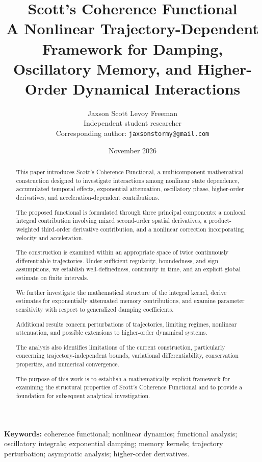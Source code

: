 \documentclass[12pt]{article}
\title{
\textbf{Scott's Coherence Functional}\\[0.5em]
\large A Nonlinear Trajectory-Dependent Framework
for Damping, Oscillatory Memory, and Higher-Order
Dynamical Interactions
}
\author{
Jaxson Scott Levoy Freeman\\
\small Independent student researcher\\
\small Corresponding author:
\texttt{jaxsonstormy@gmail.com}
}
\date{November 2026}
\numberwithin{equation}{section}
\theoremstyle{definition}
\theoremstyle{remark}
\begin{document}
\maketitle


\begin{abstract}

This paper introduces Scott's Coherence Functional,
a multicomponent mathematical construction designed
to investigate interactions among nonlinear state
dependence, accumulated temporal effects,
exponential attenuation, oscillatory phase,
higher-order derivatives, and acceleration-dependent
contributions.

The proposed functional is formulated through three
principal components: a nonlocal integral contribution
involving mixed second-order spatial derivatives,
a product-weighted third-order derivative contribution,
and a nonlinear correction incorporating velocity
and acceleration.

The construction is examined within an appropriate
space of twice continuously differentiable
trajectories. Under sufficient regularity,
boundedness, and sign assumptions, we establish
well-definedness, continuity in time, and an explicit
global estimate on finite intervals.

We further investigate the mathematical structure
of the integral kernel, derive estimates for
exponentially attenuated memory contributions,
and examine parameter sensitivity with respect
to generalized damping coefficients.

Additional results concern perturbations of
trajectories, limiting regimes, nonlinear
attenuation, and possible extensions to higher-order
dynamical systems.

The analysis also identifies limitations of the
current construction, particularly concerning
trajectory-independent bounds, variational
differentiability, conservation properties, and
numerical convergence.

The purpose of this work is to establish a
mathematically explicit framework for examining
the structural properties of Scott's Coherence
Functional and to provide a foundation for
subsequent analytical investigation.

\end{abstract}

\noindent\textbf{Keywords:}
coherence functional; nonlinear dynamics;
functional analysis; oscillatory integrals;
exponential damping; memory kernels;
trajectory perturbation; asymptotic analysis;
higher-order derivatives.
\end{document}
